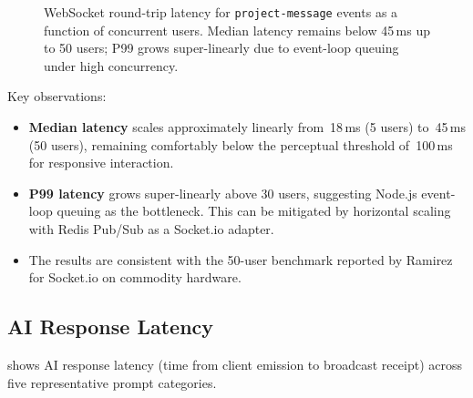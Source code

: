 \begin{figure}[H]
  \centering
  \caption{WebSocket round-trip latency for \texttt{project-message} events
    as a function of concurrent users. Median latency remains below 45\,ms
    up to 50 users; P99 grows super-linearly due to event-loop queuing under
    high concurrency.}
  \label{fig:ws_latency}
\end{figure}

Key observations:
\begin{itemize}
  \item \textbf{Median latency} scales approximately linearly from~18\,ms
    (5 users) to~45\,ms (50 users), remaining comfortably below the
    perceptual threshold of~100\,ms for responsive interaction.
  \item \textbf{P99 latency} grows super-linearly above 30 users, suggesting
    Node.js event-loop queuing as the bottleneck. This can be mitigated by
    horizontal scaling with Redis Pub/Sub as a Socket.io adapter.
  \item The results are consistent with the 50-user benchmark reported by
    Ramirez \etal~\cite{ramirez2023benchmark} for Socket.io on commodity hardware.
\end{itemize}

\subsection{AI Response Latency}

 shows AI response latency (time from client emission to
broadcast receipt) across five representative prompt categories.

